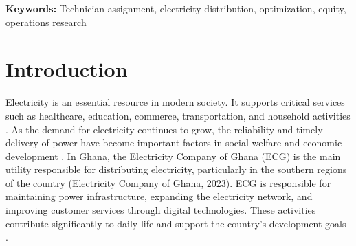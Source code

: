 \documentclass[11pt]{article}
\begin{document}
\begin{abstract}
\vspace{0.25cm}
\noindent The model solved in 0.02 seconds, achieving 100\% capacity utilization while satisfying all constraints. The optimized solution maintained a far-to-near response time ratio of 1.59, preventing the 2× disparities typical of informal assignment, and avoided the 45\% shift violation present in round-robin baseline.

\vspace{0.25cm}
\noindent Optimization ensures feasibility, efficiency, and geographic equity during peak-demand periods in regional utility operations.
\end{abstract}

\noindent\textbf{Keywords:}
Technician assignment, electricity distribution, optimization, equity, operations research

\newpage

\section*{Introduction}
Electricity is an essential resource in modern society. It supports critical services such as healthcare, education, commerce, transportation, and household activities \cite{Modi2005,Acheampong2021}. As the demand for electricity continues to grow, the reliability and timely delivery of power have become important factors in social welfare and economic development \cite{IEA2022,Modi2005}. In Ghana, the Electricity Company of Ghana (ECG) is the main utility responsible for distributing electricity, particularly in the southern regions of the country (Electricity Company of Ghana, 2023). ECG is responsible for maintaining power infrastructure, expanding the electricity network, and improving customer services through digital technologies. These activities contribute significantly to daily life and support the country's development goals \cite{ECG2023}.
\end{document}
